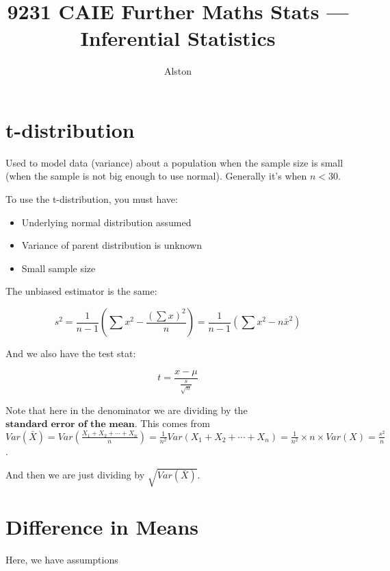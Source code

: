 \documentclass{article}
\title{9231 CAIE Further Maths Stats — Inferential Statistics}
\author{Alston}
\date{}
\theoremstyle{mytheoremstyle}
\theoremstyle{mytheoremstyle}
\theoremstyle{myproblemstyle}
\begin{document}
    \maketitle

    \section{t-distribution}
    Used to model data (variance) about a population when the sample size is small (when the sample is not big enough to use normal). Generally it's when $n < 30$.

    To use the t-distribution, you must have: 

    \begin{itemize}
        \item Underlying normal distribution assumed
        \item Variance of parent distribution is unknown
        \item Small sample size
    \end{itemize}

    The unbiased estimator is the same: 

    \begin{definition}
        \[s^2 = \frac{1}{n-1}\left(\displaystyle\sum x^2 - \frac{(\sum x)^2}{n}\right) = \frac{1}{n-1}\left(\displaystyle\sum x^2 - n\bar{x}^2\right)\]
    \end{definition}

    And we also have the test stat: 
    \begin{definition}

        \[t = \frac{x - \mu}{\frac{s}{\sqrt{n}}}\]
        
    \end{definition}

    Note that here in the denominator we are dividing by the $\textbf{standard error of the mean}$. This comes from $Var(\bar{X}) = Var\left(\frac{X_1 + X_2 + \cdots + X_n}{n}\right) = \frac{1}{n^2} Var(X_1 + X_2 + \cdots + X_n) = \frac{1}{n^2} \times n \times Var(X) = \frac{s^2}{n}$.

    And then we are just dividing by $\sqrt{Var(\bar{X})}$.


    \section{Difference in Means}

    Here, we have assumptions
\end{document}
